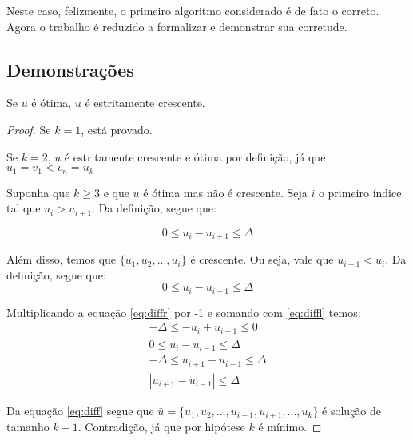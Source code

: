 Neste caso, felizmente, o primeiro algoritmo considerado é de fato o correto. Agora o trabalho é reduzido a formalizar e demonstrar sua corretude.

\subsection*{Demonstrações}

\begin{prop} \label{salto:cres}
Se $u$ é ótima, $u$ é estritamente crescente.
\end{prop}
\begin{proof}

Se $k = 1$, está provado.

Se $k = 2$, $u$ é estritamente crescente e ótima por definição, já que $u_1 = v_1 < v_n = u_{k}$

Suponha que $k \geq 3$ e que $u$ é ótima mas não é crescente. Seja $i$ o primeiro índice tal que $u_{i} > u_{i + 1}$. Da definição, segue que:

\begin{equation} \label{eq:diffr}
0 \leq u_i - u_{i + 1} \leq \Delta
\end{equation}

Além disso, temos que $\{u_1, u_2, ..., u_i\}$ é crescente. Ou seja, vale que $u_{i - 1} < u_i$. Da definição, segue que:
\begin{equation} \label{eq:diffl}
0 \leq u_i - u_{i - 1} \leq \Delta
\end{equation}

Multiplicando a equação \ref{eq:diffr} por -1 e somando com \ref{eq:diffl} temos:
\begin{align}  \label{eq:diff}
-\Delta \leq - u_i + u_{i + 1} \leq 0 \nonumber \\
0 \leq u_i - u_{i - 1} \leq \Delta \nonumber \\
-\Delta \leq u_{i + 1} - u_{i - 1} \leq \Delta \nonumber \\
|u_{i + 1} - u_{i - 1}| \leq \Delta
\end{align}

Da equação \ref{eq:diff} segue que $\bar{u} = \{u_1, u_2, ..., u_{i - 1}, u_{i + 1}, ..., u_k\}$ é solução de tamanho $k - 1$. Contradição, já que por hipótese $k$ é mínimo.

\end{proof}

